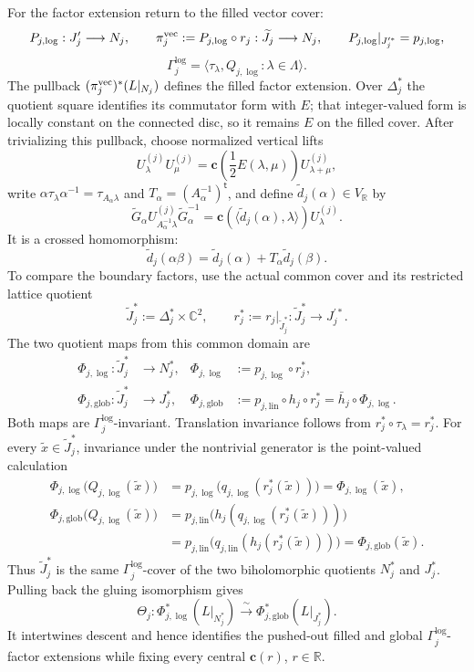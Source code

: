 \begin{enumerate}[leftmargin=1.8em,itemsep=.65em]
For the factor extension return to the filled vector cover:
\[
 P_{j,\log}:J'_j\longrightarrow N_j,\qquad
 \pi_j^{\rm vec}:=P_{j,\log}\circ r_j:
 \widetilde J_j\longrightarrow N_j,\qquad
 P_{j,\log}|_{J_j^{\prime *}}=p_{j,\log},
\]
\[
 \Gamma_j^{\log}
 =\langle\tau_\lambda,Q_{j,\log}:\lambda\in\Lambda\rangle.
\]
The pullback $(\pi_j^{\rm vec})^*(L|_{N_j})$ defines the filled factor
extension.  Over $\Delta_j^*$ the quotient square identifies its
commutator form with $E$; that integer-valued form is locally constant on
the connected disc, so it remains $E$ on the filled cover.  After
trivializing this pullback, choose normalized vertical lifts
\[
 U_\lambda^{(j)}U_\mu^{(j)}
 =\mathbf c\!\left(\frac12E(\lambda,\mu)\right)
 U_{\lambda+\mu}^{(j)},
\]
write
$\alpha\tau_\lambda\alpha^{-1}=\tau_{A_\alpha\lambda}$ and
$T_\alpha=(A_\alpha^{-1})^{\mathsf t}$, and define
$\widetilde d_j(\alpha)\in V_{\mathbb R}$ by
\[
 \widetilde G_\alpha U_{A_\alpha^{-1}\lambda}^{(j)}
 \widetilde G_\alpha^{-1}
 =\mathbf c\!\left(
 \langle\widetilde d_j(\alpha),\lambda\rangle\right)
 U_\lambda^{(j)}.
\]
It is a crossed homomorphism:
\[
 \widetilde d_j(\alpha\beta)
 =\widetilde d_j(\alpha)+T_\alpha\widetilde d_j(\beta).
\]
To compare the boundary factors, use the actual common cover and its
restricted lattice quotient
\[
 \widetilde J_j^*:=\Delta_j^*\times\mathbb C^2,
 \qquad
 r_j^*:=r_j|_{\widetilde J_j^*}:
 \widetilde J_j^*\longrightarrow J_j^{\prime *}.
\]
The two quotient maps from this common domain are
\[
\begin{aligned}
 \Phi_{j,\log}:\widetilde J_j^*&\longrightarrow N_j^*,&
 \Phi_{j,\log}&:=p_{j,\log}\circ r_j^*,\\
 \Phi_{j,\mathrm{glob}}:\widetilde J_j^*&\longrightarrow J_j^*,&
 \Phi_{j,\mathrm{glob}}&:=p_{j,\mathrm{lin}}\circ h_j\circ r_j^*
 =\bar h_j\circ\Phi_{j,\log}.
\end{aligned}
\]
Both maps are $\Gamma_j^{\log}$-invariant.  Translation invariance follows
from $r_j^*\circ\tau_\lambda=r_j^*$.  For every
$\widetilde x\in\widetilde J_j^*$, invariance under the nontrivial generator
is the point-valued calculation
\[
\begin{aligned}
 \Phi_{j,\log}\bigl(Q_{j,\log}(\widetilde x)\bigr)
 &=p_{j,\log}\bigl(q_{j,\log}(r_j^*(\widetilde x))\bigr)
 =\Phi_{j,\log}(\widetilde x),\\
 \Phi_{j,\mathrm{glob}}\bigl(Q_{j,\log}(\widetilde x)\bigr)
 &=p_{j,\mathrm{lin}}\bigl(
 h_j(q_{j,\log}(r_j^*(\widetilde x)))\bigr)\\
 &=p_{j,\mathrm{lin}}\bigl(
 q_{j,\mathrm{lin}}(h_j(r_j^*(\widetilde x)))\bigr)
 =\Phi_{j,\mathrm{glob}}(\widetilde x).
\end{aligned}
\]
Thus $\widetilde J_j^*$ is the same $\Gamma_j^{\log}$-cover of the two
biholomorphic quotients $N_j^*$ and $J_j^*$.  Pulling back the gluing
isomorphism gives
\[
 \Theta_j:
 \Phi_{j,\log}^*(L|_{N_j^*})
 \xrightarrow{\ \sim\ }
 \Phi_{j,\mathrm{glob}}^*(L|_{J_j^*}).
\]
It intertwines descent and hence identifies the pushed-out filled and global
$\Gamma_j^{\log}$-factor extensions while fixing every central
$\mathbf c(r)$, $r\in\mathbb R$.


\end{enumerate}
